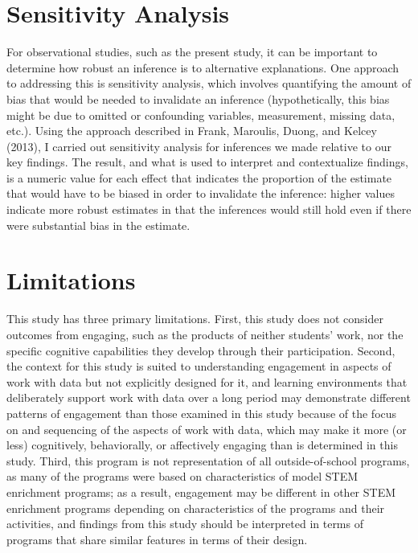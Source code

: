 \documentclass[]{book}
\theoremstyle{definition}
\theoremstyle{definition}
\theoremstyle{definition}
\theoremstyle{remark}
\begin{document}
\section{Sensitivity Analysis}\label{sensitivity-analysis}

For observational studies, such as the present study, it can be
important to determine how robust an inference is to alternative
explanations. One approach to addressing this is sensitivity analysis,
which involves quantifying the amount of bias that would be needed to
invalidate an inference (hypothetically, this bias might be due to
omitted or confounding variables, measurement, missing data, etc.).
Using the approach described in Frank, Maroulis, Duong, and Kelcey
(2013), I carried out sensitivity analysis for inferences we made
relative to our key findings. The result, and what is used to interpret
and contextualize findings, is a numeric value for each effect that
indicates the proportion of the estimate that would have to be biased in
order to invalidate the inference: higher values indicate more robust
estimates in that the inferences would still hold even if there were
substantial bias in the estimate.

\section{Limitations}\label{limitations}

This study has three primary limitations. First, this study does not
consider outcomes from engaging, such as the products of neither
students' work, nor the specific cognitive capabilities they develop
through their participation. Second, the context for this study is
suited to understanding engagement in aspects of work with data but not
explicitly designed for it, and learning environments that deliberately
support work with data over a long period may demonstrate different
patterns of engagement than those examined in this study because of the
focus on and sequencing of the aspects of work with data, which may make
it more (or less) cognitively, behaviorally, or affectively engaging
than is determined in this study. Third, this program is not
representation of all outside-of-school programs, as many of the
programs were based on characteristics of model STEM enrichment
programs; as a result, engagement may be different in other STEM
enrichment programs depending on characteristics of the programs and
their activities, and findings from this study should be interpreted in
terms of programs that share similar features in terms of their design.
\end{document}
